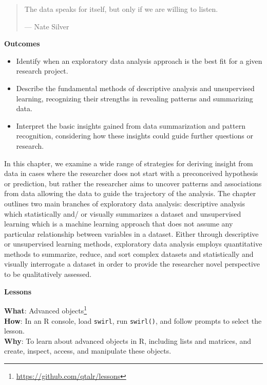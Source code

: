 \documentclass[
  letterpaper,
]{latex/krantz}
\providecommand{\tightlist}{%
  \setlength{\itemsep}{0pt}\setlength{\parskip}{0pt}}\usepackage{longtable,booktabs,array}
\theoremstyle{definition}
\theoremstyle{remark}
\DeclareRobustCommand{\href}[2]{#2\footnote{\url{#1}}}
\begin{document}
\begin{quote}
The data speaks for itself, but only if we are willing to listen.

--- Nate Silver
\end{quote}

\begin{tcolorbox}[enhanced jigsaw, colback=white, colframe=quarto-callout-color-frame, leftrule=.75mm, opacityback=0, rightrule=.15mm, bottomrule=.15mm, toprule=.15mm, breakable, left=2mm, arc=.35mm]

\textbf{ Outcomes}

\begin{itemize}
\tightlist
\item
  Identify when an exploratory data analysis approach is the best fit
  for a given research project.
\item
  Describe the fundamental methods of descriptive analysis and
  unsupervised learning, recognizing their strengths in revealing
  patterns and summarizing data.
\item
  Interpret the basic insights gained from data summarization and
  pattern recognition, considering how these insights could guide
  further questions or research.
\end{itemize}

\end{tcolorbox}

In this chapter, we examine a wide range of strategies for deriving
insight from data in cases where the researcher does not start with a
preconceived hypothesis or prediction, but rather the researcher aims to
uncover patterns and associations from data allowing the data to guide
the trajectory of the analysis. The chapter outlines two main branches
of exploratory data analysis: descriptive analysis which statistically
and/ or visually summarizes a dataset and unsupervised learning which is
a machine learning approach that does not assume any particular
relationship between variables in a dataset. Either through descriptive
or unsupervised learning methods, exploratory data analysis employs
quantitative methods to summarize, reduce, and sort complex datasets and
statistically and visually interrogate a dataset in order to provide the
researcher novel perspective to be qualitatively assessed.

\begin{tcolorbox}[enhanced jigsaw, colback=white, colframe=quarto-callout-color-frame, leftrule=.75mm, opacityback=0, rightrule=.15mm, bottomrule=.15mm, toprule=.15mm, breakable, left=2mm, arc=.35mm]

\textbf{ Lessons}

\textbf{What}: \href{https://github.com/qtalr/lessons}{Advanced
objects}\\
\textbf{How}: In an R console, load \texttt{swirl}, run
\texttt{swirl()}, and follow prompts to select the lesson.\\
\textbf{Why}: To learn about advanced objects in R, including lists and
matrices, and create, inspect, access, and manipulate these objects.

\end{tcolorbox}
\end{document}

